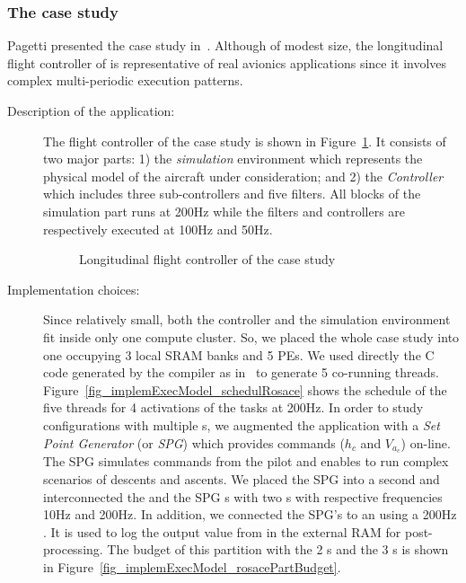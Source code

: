 \documentclass[main.tex]{subfiles}
\begin{document}
\subsubsection{The \rosace case study} Pagetti \etal presented the \rosace case
study in~\cite{Pagetti2014}. Although of modest size, the longitudinal flight
controller of \rosace is representative of real avionics applications since it
involves complex multi-periodic execution patterns.
\begin{description}
    \item[Description of the application: ]
        The flight controller of the \rosace case study is shown in
        Figure~\ref{fig_implemExecModel_rosace}. It consists of two major
        parts: 1) the \emph{simulation} environment which represents the
        physical model of the aircraft under consideration; and 2) the
        \emph{Controller} which includes three sub-controllers and five
        filters. All blocks of the simulation part runs at 200Hz while the
        filters and controllers are respectively executed at 100Hz and 50Hz. 

            \begin{figure}
                \centering
                \scalebox{1.5}{}
                \caption{Longitudinal flight controller of the \rosace case study}
                \label{fig_implemExecModel_rosace}
            \end{figure}

        \item[Implementation choices: ] Since relatively small, both the
            \rosace controller and the simulation environment fit inside only
            one compute cluster. So, we placed the whole \rosace case study
            into one \PN{} occupying 3 local SRAM banks and 5 PEs. We used
            directly the C code generated by the \prelude compiler as
            in~\cite{Pagetti2014} to generate 5 co-running threads.
            Figure~\ref{fig_implemExecModel_schedulRosace} shows the schedule
            of the five threads for 4 activations of the \rosace tasks at
            200Hz. In order to study configurations with multiple \PN{}s, we
            augmented the \rosace application with a \emph{Set Point Generator}
            (or \emph{SPG}) which provides commands ($h_c$ and $V_{a_c}$)
            on-line. The SPG simulates commands from the pilot and enables to
            run complex scenarios of descents and ascents. We placed the SPG
            into a second \PN{} and interconnected the \rosace and the SPG
            \PN{}s with two \PC{}s with respective frequencies 10Hz and 200Hz.
            In addition, we connected the SPG's \PN{} to an \ION{} using a
            200Hz \PC{}. It is used to log the output value from \rosace in the
            external RAM for post-processing. The budget of this partition with
            the 2 \PN{}s and the 3 \PC{}s is shown in
            Figure~\ref{fig_implemExecModel_rosacePartBudget}. 



\end{description}
\end{document}
